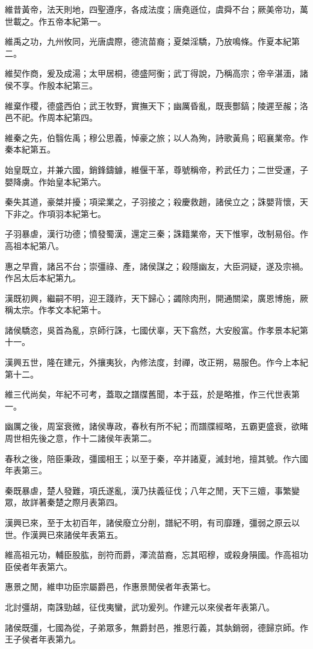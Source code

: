 \begin{pinyinscope}
維昔黃帝，法天則地，四聖遵序，各成法度；唐堯遜位，虞舜不台；厥美帝功，萬世載之。作五帝本紀第一。

維禹之功，九州攸同，光唐虞際，德流苗裔；夏桀淫驕，乃放鳴條。作夏本紀第二。

維契作商，爰及成湯；太甲居桐，德盛阿衡；武丁得說，乃稱高宗；帝辛湛湎，諸侯不享。作殷本紀第三。

維棄作稷，德盛西伯；武王牧野，實撫天下；幽厲昏亂，既喪酆鎬；陵遲至赧；洛邑不祀。作周本紀第四。

維秦之先，伯翳佐禹；穆公思義，悼豪之旅；以人為殉，詩歌黃鳥；昭襄業帝。作秦本紀第五。

始皇既立，并兼六國，銷鋒鑄鐻，維偃干革，尊號稱帝，矜武任力；二世受運，子嬰降虜。作始皇本紀第六。

秦失其道，豪桀并擾；項梁業之，子羽接之；殺慶救趙，諸侯立之；誅嬰背懷，天下非之。作項羽本紀第七。

子羽暴虐，漢行功德；憤發蜀漢，還定三秦；誅籍業帝，天下惟寧，改制易俗。作高祖本紀第八。

惠之早霣，諸呂不台；崇彊祿、產，諸侯謀之；殺隱幽友，大臣洞疑，遂及宗禍。作呂太后本紀第九。

漢既初興，繼嗣不明，迎王踐祚，天下歸心；蠲除肉刑，開通關梁，廣恩博施，厥稱太宗。作孝文本紀第十。

諸侯驕恣，吳首為亂，京師行誅，七國伏辜，天下翕然，大安殷富。作孝景本紀第十一。

漢興五世，隆在建元，外攘夷狄，內修法度，封禪，改正朔，易服色。作今上本紀第十二。

維三代尚矣，年紀不可考，蓋取之譜牒舊聞，本于茲，於是略推，作三代世表第一。

幽厲之後，周室衰微，諸侯專政，春秋有所不紀；而譜牒經略，五霸更盛衰，欲睹周世相先後之意，作十二諸侯年表第二。

春秋之後，陪臣秉政，彊國相王；以至于秦，卒并諸夏，滅封地，擅其號。作六國年表第三。

秦既暴虐，楚人發難，項氏遂亂，漢乃扶義征伐；八年之閒，天下三嬗，事繁變眾，故詳著秦楚之際月表第四。

漢興已來，至于太初百年，諸侯廢立分削，譜紀不明，有司靡踵，彊弱之原云以世。作漢興已來諸侯年表第五。

維高祖元功，輔臣股肱，剖符而爵，澤流苗裔，忘其昭穆，或殺身隕國。作高祖功臣侯者年表第六。

惠景之閒，維申功臣宗屬爵邑，作惠景閒侯者年表第七。

北討彊胡，南誅勁越，征伐夷蠻，武功爰列。作建元以來侯者年表第八。

諸侯既彊，七國為從，子弟眾多，無爵封邑，推恩行義，其埶銷弱，德歸京師。作王子侯者年表第九。


\end{pinyinscope}
